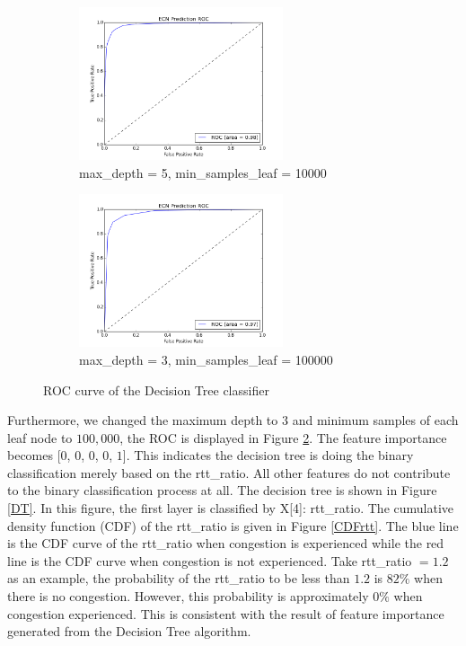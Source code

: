 \begin{figure}[!htb]\centering
   \begin{subfigure}{0.49\textwidth}
     \includegraphics[width=6cm]{DecisionTreeRoc.png}
\caption{max\_depth = 5, min\_samples\_leaf = 10000}
\label{DecisionTreeRoc}

   \end{subfigure}
   \begin {subfigure}{0.49\textwidth}
     \includegraphics[width=6cm]{DTRoc.png}
\caption{max\_depth = 3, min\_samples\_leaf = 100000}
\label{DTRoc}
   \end{subfigure}
   \caption{ROC curve of the Decision Tree classifier}
\label{fig:roc1}
\end{figure}
Furthermore, we changed the maximum depth to $3$ and minimum samples of each leaf node to $100,000$, the ROC is displayed in Figure \ref{DTRoc}. The feature importance becomes [$0$, $0$, $0$, $0$, $1$]. This indicates the decision tree is doing the binary classification merely based on the rtt\_ratio. All other features do not contribute to the binary classification process at all. 
The decision tree is shown in Figure \ref{DT}. In this figure, the first layer is classified by X[4]: rtt\_ratio. The cumulative density function (CDF) of the rtt\_ratio is given in Figure \ref{CDFrtt}. The blue line is the CDF curve of  the rtt\_ratio when congestion is experienced while the red line is the CDF curve when congestion is not experienced. Take rtt\_ratio $=1.2$ as an example, the probability of the rtt\_ratio to be less than $1.2$ is $82\%$ when there is no congestion. However, this probability is approximately $0\%$ when congestion experienced. This is consistent with the result of feature importance generated from the Decision Tree algorithm. 

